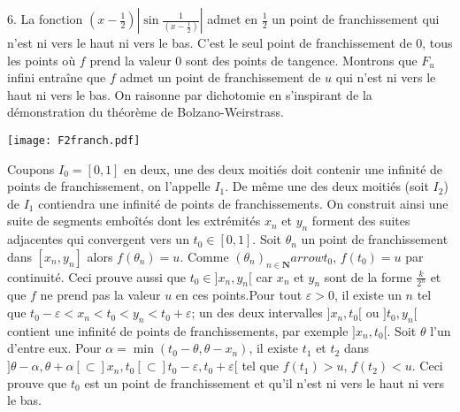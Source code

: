 6.  La fonction $(x-\frac{1}{2})| \sin \frac{1}{(x-\frac{1}{2})}| $ admet en $\frac{1%
}{2}$ un point de franchissement qui n'est ni vers le haut ni vers
le bas. C'est le seul point de franchissement de $0$, tous les
points o{\`u} $f$ prend la valeur 0 sont des points de
tangence.\newline
Montrons que $F_{u}$ infini entra\^{i}ne que $f$
admet un point de franchissement de $u$ qui n'est ni vers le haut
ni vers le bas. On raisonne par dichotomie en s'inspirant de la
d{\'e}monstration du th{\'e}or{\`e}me de
Bolzano-Weirstrass.\newline
\begin{floatingfigure}{5cm}
\texttt{[image: F2franch.pdf]}
\end{floatingfigure}
Coupons $I_{0}=[ 0,1] $ en deux, une des deux moiti{\'e}s doit
contenir une infinit{\'e} de points de franchissement, on
l'appelle $I_{1}$. De m{\^e}me une des deux moiti{\'e}s (soit
$I_{2}$) de $I_{1}$ contiendra une infinit{\'e} de points de
franchissements. On construit ainsi une suite de segments
embo\^{i}t{\'e}s dont les extr{\'e}mit{\'e}s $x_{n}$ et $y_{n}$
forment des suites adjacentes qui convergent vers un $t_{0}\in [
0,1] $.\newline
 Soit
$\theta _{n}$ un point de franchissement dans $[ x_{n},y_{n}] $
alors $f(\theta _{n})=u.$ Comme $(\theta _{n})_{n\in
\mathbf{N}}arrow t_{0}$, $f(t_{0})=u$ par continuit{\'e}. Ceci
prouve aussi que $t_{0}\in ] x_{n},y_{n}[ $ car $x_{n}$ et $y_{n}$
sont de la forme $\frac{k}{2^{n}}$ et que $f$ ne prend pas la
valeur $u$ en ces points.\newline Pour tout $\varepsilon >0$, il
existe un $n$ tel que $t_{0}-\varepsilon
<x_{n}<t_{0}<y_{n}<t_{0}+\varepsilon $; un des deux intervalles $]
x_{n},t_{0}[ $ ou $] t_{0},y_{n}[ $ contient une infinit{\'e} de
points de franchissements, par exemple $] x_{n},t_{0}[ .$ Soit
$\theta $ l'un d'entre eux.\newline
Pour $\alpha =\min (t_{0}-\theta ,\theta -x_{n})$, il existe $t_{1}$ et $%
t_{2}$ dans $] \theta -\alpha ,\theta +\alpha [ \subset ]
x_{n},t_{0}[ \subset ] t_{0}-\varepsilon ,t_{0}+\varepsilon [ $
tel que $f(t_{1})>u$, $f(t_{2})<u$. Ceci prouve que $t_{0}$ est un
point de franchissement et qu'il n'est ni vers le haut ni vers le
bas.
